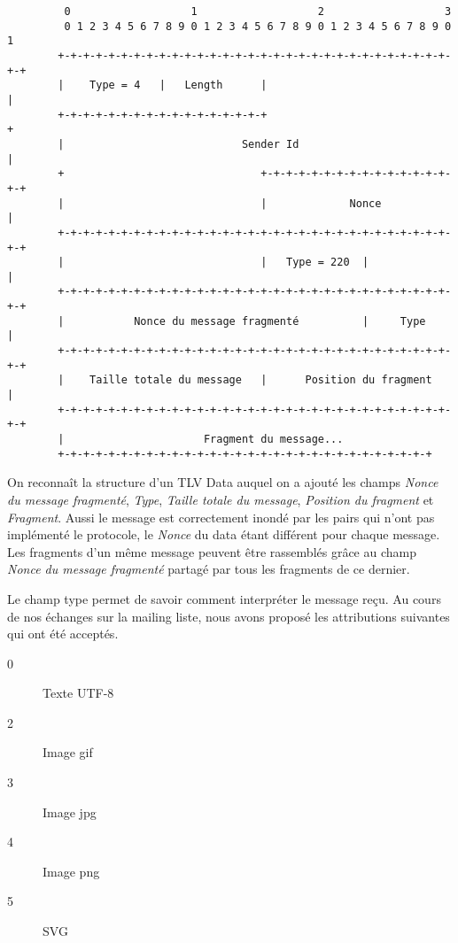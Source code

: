 \documentclass[a4paper,10pt]{article} %
\begin{document}
\begin{verbatim}
         0                   1                   2                   3
         0 1 2 3 4 5 6 7 8 9 0 1 2 3 4 5 6 7 8 9 0 1 2 3 4 5 6 7 8 9 0 1
        +-+-+-+-+-+-+-+-+-+-+-+-+-+-+-+-+-+-+-+-+-+-+-+-+-+-+-+-+-+-+-+-+
        |    Type = 4   |   Length      |                               |
        +-+-+-+-+-+-+-+-+-+-+-+-+-+-+-+-+                               +
        |                            Sender Id                          |
        +                               +-+-+-+-+-+-+-+-+-+-+-+-+-+-+-+-+
        |                               |             Nonce             |
        +-+-+-+-+-+-+-+-+-+-+-+-+-+-+-+-+-+-+-+-+-+-+-+-+-+-+-+-+-+-+-+-+
        |                               |   Type = 220  |               |
        +-+-+-+-+-+-+-+-+-+-+-+-+-+-+-+-+-+-+-+-+-+-+-+-+-+-+-+-+-+-+-+-+
        |           Nonce du message fragmenté          |     Type      |
        +-+-+-+-+-+-+-+-+-+-+-+-+-+-+-+-+-+-+-+-+-+-+-+-+-+-+-+-+-+-+-+-+
        |    Taille totale du message   |      Position du fragment     |
        +-+-+-+-+-+-+-+-+-+-+-+-+-+-+-+-+-+-+-+-+-+-+-+-+-+-+-+-+-+-+-+-+
        |                      Fragment du message...
        +-+-+-+-+-+-+-+-+-+-+-+-+-+-+-+-+-+-+-+-+-+-+-+-+-+-+-+-+-+
\end{verbatim}

On reconnaît la structure d'un TLV Data auquel on a ajouté les champs \textit{Nonce du message fragmenté}, \textit{Type}, \textit{Taille totale du message}, \textit{Position du fragment} et \textit{Fragment}. Aussi le message est correctement inondé par les pairs qui n'ont pas implémenté le protocole, le \textit{Nonce} du data étant différent pour chaque message. Les fragments d'un même message peuvent être rassemblés grâce au champ \textit{Nonce du message fragmenté} partagé par tous les fragments de ce dernier.

Le champ type permet de savoir comment interpréter le message reçu. Au cours de nos échanges sur la mailing liste, nous avons proposé les attributions suivantes qui ont été acceptés.

\begin{description}
\item[0] Texte UTF-8
\item[2] Image gif
\item[3] Image jpg
\item[4] Image png
\item[5] SVG
\end{description}
\end{document}
